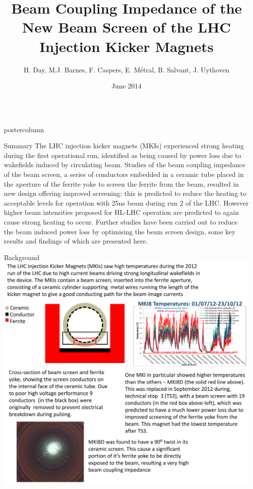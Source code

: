 \documentclass[final,hyperref={pdfpagelabels=false}]{beamer}
\title{Beam Coupling Impedance of the New Beam Screen of the LHC Injection Kicker Magnets}
\author{H. Day, M.J. Barnes, F. Caspers, E. Métral, B. Salvant, J. Uythoven}
\institute[CERN]{CERN, Geneva, Switzerland}
\date[June 2014]{June 2014}
\newlength{\columnheight}
\begin{document}
\begin{frame}
  \begin{columns}
    \begin{column}{.49\textwidth}
      \begin{beamercolorbox}[center,wd=\textwidth]{postercolumn}
        \begin{minipage}[T]{.95\textwidth}  %
          \parbox[t][\columnheight]{\textwidth}{ %
            \begin{block}{Summary}
\small{
The LHC injection kicker magnets (MKIs) experienced strong heating during the first operational run, identified as being caused by power loss due to wakefields induced by circulating beam. Studies of the beam coupling impedance of the beam screen, a series of conductors embedded in a ceramic tube placed in the aperture of the ferrite yoke to screen the ferrite from the beam, resulted in new design offering improved screening: this is predicted to reduce the heating to acceptable levels for operation with 25ns beam during run 2 of the LHC. However higher beam intensities proposed for HL-LHC operation are predicted to again cause strong heating to occur. Further studies have been carried out to reduce the beam induced power loss by optimising the beam screen design, some key results and findings of which are presented here.
}
\end{block}
            \vfill
	\begin{block}{Background}
\includegraphics[width=1.0\textwidth]{introductionPicture.pdf}

\end{block}}
\end{minipage}
\end{beamercolorbox}
\end{column}
\end{columns}
\end{frame}
\end{document}
